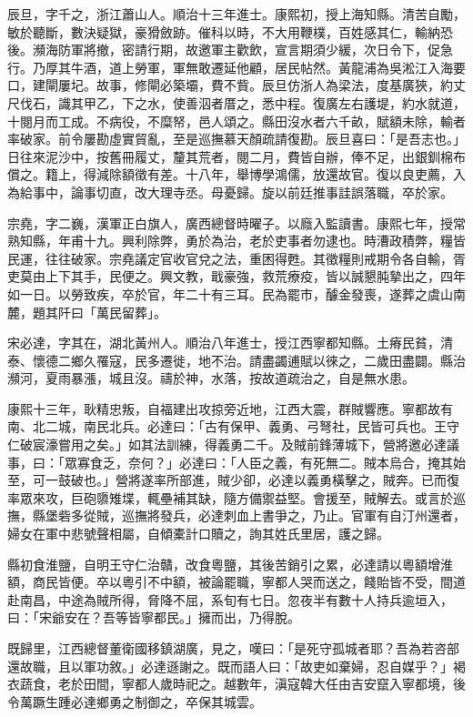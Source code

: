\begin{pinyinscope}
辰旦，字千之，浙江蕭山人。順治十三年進士。康熙初，授上海知縣。清苦自勵，敏於聽斷，數決疑獄，豪猾斂跡。催科以時，不大用鞭樸，百姓感其仁，輸納恐後。瀕海防軍將撤，密請行期，故邀軍主歡飲，宣言期須少緩，次日令下，促急行。乃厚其牛酒，道上勞軍，軍無敢遷延他顧，居民帖然。黃龍浦為吳淞江入海要口，建閘屢圮。故事，修閘必築壩，費不貲。辰旦仿浙人為梁法，度基廣狹，約丈尺伐石，識其甲乙，下之水，使善泅者厝之，悉中程。復廣左右護堤，約水就道，十閱月而工成。不病役，不糜帑，邑人頌之。縣田沒水者六千畝，賦額未除，輸者率破家。前令屢勘虛實貿亂，至是巡撫慕天顏疏請復勘。辰旦喜曰：「是吾志也。」日往來泥沙中，按舊冊履丈，釐其荒者，閱二月，費皆自辦，俸不足，出銀釧棉布償之。籍上，得減除額徵有差。十八年，舉博學鴻儒，放還故官。復以良吏薦，入為給事中，論事切直，改大理寺丞。母憂歸。旋以前廷推事詿誤落職，卒於家。

宗堯，字二巍，漢軍正白旗人，廣西總督時曜子。以廕入監讀書。康熙七年，授常熟知縣，年甫十九。興利除弊，勇於為治，老於吏事者勿逮也。時漕政積弊，糧皆民運，往往破家。宗堯議定官收官兌之法，重困得甦。其徵糧則戒期令各自輸，胥吏莫由上下其手，民便之。興文教，戢豪強，救荒療疫，皆以誠懇肫摯出之，四年如一日。以勞致疾，卒於官，年二十有三耳。民為罷市，醵金發喪，遂葬之虞山南麓，題其阡曰「萬民留葬」。

宋必達，字其在，湖北黃州人。順治八年進士，授江西寧都知縣。土瘠民貧，清泰、懷德二鄉久罹寇，民多遷徙，地不治。請盡蠲逋賦以徠之，二歲田盡闢。縣治瀕河，夏雨暴漲，城且沒。禱於神，水落，按故道疏治之，自是無水患。

康熙十三年，耿精忠叛，自福建出攻掠旁近地，江西大震，群賊響應。寧都故有南、北二城，南民北兵。必達曰：「古有保甲、義勇、弓弩社，民皆可兵也。王守仁破宸濠嘗用之矣。」如其法訓練，得義勇二千。及賊前鋒薄城下，營將邀必達議事，曰：「眾寡食乏，奈何？」必達曰：「人臣之義，有死無二。賊本烏合，掩其始至，可一鼓破也。」營將遂率所部進，賊少卻，必達以義勇橫擊之，賊奔。已而復率眾來攻，巨砲隳雉堞，輒壘補其缺，隨方備禦益堅。會援至，賊解去。或言於巡撫，縣堡砦多從賊，巡撫將發兵，必達刺血上書爭之，乃止。官軍有自汀州還者，婦女在軍中悲號聲相屬，自傾橐計口贖之，詢其姓氏里居，護之歸。

縣初食淮鹽，自明王守仁治贛，改食粵鹽，其後苦銷引之累，必達請以粵額增淮額，商民皆便。卒以粵引不中額，被論罷職，寧都人哭而送之，餞貽皆不受，間道赴南昌，中途為賊所得，脅降不屈，系旬有七日。忽夜半有數十人持兵逾垣入，曰：「宋爺安在？吾等皆寧都民。」擁而出，乃得脫。

既歸里，江西總督董衛國移鎮湖廣，見之，嘆曰：「是死守孤城者耶？吾為若咨部還故職，且以軍功敘。」必達遜謝之。既而語人曰：「故吏如棄婦，忍自媒乎？」褐衣蔬食，老於田間，寧都人歲時祀之。越數年，滇寇韓大任由吉安竄入寧都境，後令萬蹶生踵必達鄉勇之制御之，卒保其城雲。


\end{pinyinscope}
